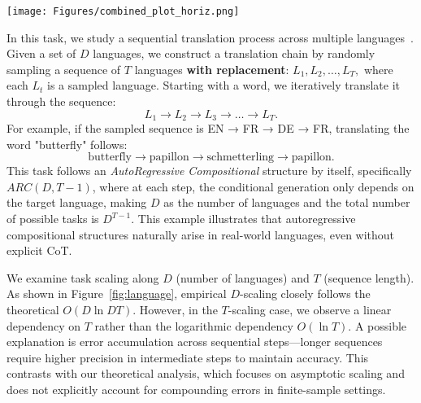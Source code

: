  \begin{figure*}[h!]
    \centering
    \texttt{[image: Figures/combined\_plot\_horiz.png]}
    \vspace{-0.2cm}
    \caption{Task generalization for language translation task: $\d$ is the number of languages and $T$ is the length of steps.}
    \vspace{-2mm}
    \label{fig:language}
\end{figure*}

In this task, we study a sequential translation process across multiple languages~\cite{garg2022can}. Given a set of \( D \) languages, we construct a translation chain by randomly sampling a sequence of \( T \) languages \textbf{with replacement}:  \(L_1, L_2, \dots, L_T,\)
where each \( L_t \) is a sampled language. Starting with a word, we iteratively translate it through the sequence:
\vspace{-2mm}
\[
L_1 \to L_2 \to L_3 \to \dots \to L_T.
\]
For example, if the sampled sequence is EN → FR → DE → FR, translating the word "butterfly" follows:
\vspace{-1mm}
\[
\text{butterfly} \to \text{papillon} \to \text{schmetterling} \to \text{papillon}.
\]
This task follows an \textit{AutoRegressive Compositional} structure by itself, specifically \( ARC(D, T-1) \), where at each step, the conditional generation only depends on the target language, making \( D \) as the number of languages and the total number of possible tasks is \( D^{T-1} \). This example illustrates that autoregressive compositional structures naturally arise in real-world languages, even without explicit CoT. 

We examine task scaling along \( D \) (number of languages) and \( T \) (sequence length). As shown in Figure~\ref{fig:language}, empirical  \( D \)-scaling closely follows the theoretical \( O(D \ln D T) \). However, in the \( T \)-scaling case, we observe a linear dependency on \( T \) rather than the logarithmic dependency \(O(\ln T) \). A possible explanation is error accumulation across sequential steps—longer sequences require higher precision in intermediate steps to maintain accuracy. This contrasts with our theoretical analysis, which focuses on asymptotic scaling and does not explicitly account for compounding errors in finite-sample settings.


